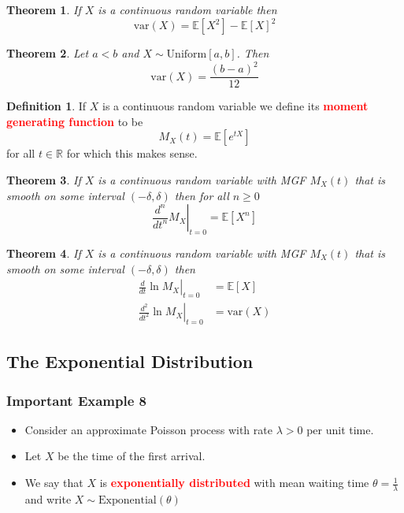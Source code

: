 \documentclass{article}
\newcommand{\R}{\mathbb{R}}
\newcommand{\E}{\mathbb{E}}
\newcommand{\var}{\text{var}}
\newcommand{\bfred}[1]{\textcolor{red}{\textbf{#1}}}
\theoremstyle{plain}
\newtheorem{thm}{Theorem}[section]
\theoremstyle{definition}
\newtheorem{defn}{Definition}[section]
\theoremstyle{remark}
\begin{document}
\begin{thm}
    If $X$ is a continuous random variable then \[\var(X)=\E[X^2]-\E[X]^2\]
\end{thm}

\begin{thm}
    Let $a<b$ and $X \sim\text{Uniform}[a,b]$. Then \[\var(X)=\frac{(b-a)^2}{12}\]
\end{thm}

\begin{defn}
    If $X$ is a continuous random variable we define its \bfred{moment generating function} to be \[M_X(t)=\E[e^{tX}]\] for all $t\in\R$ for which this makes sense.
\end{defn}

\begin{thm}
    If $X$ is a continuous random variable with MGF $M_X(t)$ that is smooth on some interval $(-\delta,\delta)$ then for all $n\geq0$ \[\left.\frac{d^n}{dt^n}M_X\right\vert_{t=0} = \E[X^n]\]
\end{thm}

\begin{thm}
    If $X$ is a continuous random variable with MGF $M_X(t)$ that is smooth on some interval $(-\delta, \delta)$ then
    \begin{align*}
        \left.\frac{d}{dt}\ln M_X\right\vert_{t=0} &= \E[X] \\
        \left.\frac{d^2}{dt^2}\ln M_X\right\vert_{t=0} &= \var(X)
    \end{align*}
\end{thm}

\subsection{The Exponential Distribution}

\subsubsection*{Important Example 8}

\begin{tcolorbox}[title = Exponential Distribution, colback = SkyBlue!5!white,colframe = SkyBlue!75!black]
    \begin{itemize}
        \item Consider an approximate Poisson process with rate $\lambda>0$ per unit time.
        \item Let $X$ be the time of the first arrival.
        \item We say that $X$ is \bfred{exponentially distributed} with mean waiting time $\theta=\frac{1}{\lambda}$ and write $X \sim\text{Exponential}(\theta)$
    \end{itemize}
\end{tcolorbox}
\end{document}
